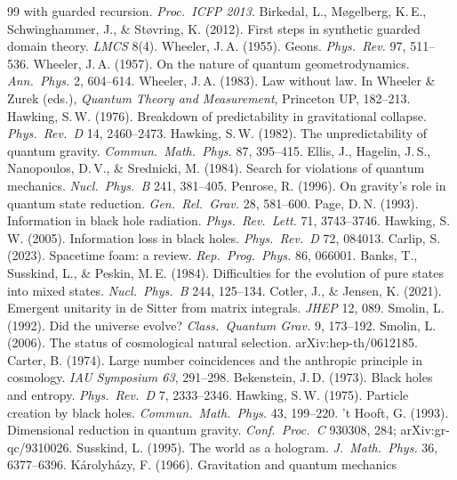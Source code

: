 \documentclass[11pt]{article}
\begin{document}
\begin{thebibliography}{99}
  with guarded recursion. \emph{Proc.\ ICFP 2013}.
 Birkedal, L., M\o gelberg, K.\,E., Schwinghammer, J., \&
  St\o vring, K. (2012). First steps in synthetic guarded domain theory.
  \emph{LMCS} 8(4).
 Wheeler, J.\,A. (1955). Geons. \emph{Phys.\ Rev.} 97, 511--536.
 Wheeler, J.\,A. (1957). On the nature of quantum
  geometrodynamics. \emph{Ann.\ Phys.} 2, 604--614.
 Wheeler, J.\,A. (1983). Law without law. In Wheeler \& Zurek
  (eds.), \emph{Quantum Theory and Measurement}, Princeton UP, 182--213.
 Hawking, S.\,W. (1976). Breakdown of predictability in
  gravitational collapse. \emph{Phys.\ Rev.\ D} 14, 2460--2473.
 Hawking, S.\,W. (1982). The unpredictability of quantum
  gravity. \emph{Commun.\ Math.\ Phys.} 87, 395--415.
 Ellis, J., Hagelin, J.\,S., Nanopoulos, D.\,V., \&
  Srednicki, M. (1984). Search for violations of quantum mechanics.
  \emph{Nucl.\ Phys.\ B} 241, 381--405.
 Penrose, R. (1996). On gravity's role in quantum state
  reduction. \emph{Gen.\ Rel.\ Grav.} 28, 581--600.
 Page, D.\,N. (1993). Information in black hole radiation.
  \emph{Phys.\ Rev.\ Lett.} 71, 3743--3746.
 Hawking, S.\,W. (2005). Information loss in black holes.
  \emph{Phys.\ Rev.\ D} 72, 084013.
 Carlip, S. (2023). Spacetime foam: a review. \emph{Rep.\
  Prog.\ Phys.} 86, 066001.
 Banks, T., Susskind, L., \& Peskin, M.\,E. (1984).
  Difficulties for the evolution of pure states into mixed states.
  \emph{Nucl.\ Phys.\ B} 244, 125--134.
 Cotler, J., \& Jensen, K. (2021). Emergent unitarity in de
  Sitter from matrix integrals. \emph{JHEP} 12, 089.
 Smolin, L. (1992). Did the universe evolve? \emph{Class.\
  Quantum Grav.} 9, 173--192.
\bibitem{Smo06} Smolin, L. (2006). The status of cosmological natural
  selection. arXiv:hep-th/0612185.
\bibitem{Car74} Carter, B. (1974). Large number coincidences and the
  anthropic principle in cosmology. \emph{IAU Symposium 63}, 291--298.
\bibitem{Bek73} Bekenstein, J.\,D. (1973). Black holes and entropy.
  \emph{Phys.\ Rev.\ D} 7, 2333--2346.
\bibitem{Haw75} Hawking, S.\,W. (1975). Particle creation by black holes.
  \emph{Commun.\ Math.\ Phys.} 43, 199--220.
\bibitem{tHooft93} 't Hooft, G. (1993). Dimensional reduction in quantum
  gravity. \emph{Conf.\ Proc.\ C} 930308, 284; arXiv:gr-qc/9310026.
\bibitem{Suss95} Susskind, L. (1995). The world as a hologram. \emph{J.\ Math.\
  Phys.} 36, 6377--6396.
\bibitem{Kar66} K\'arolyh\'azy, F. (1966). Gravitation and quantum mechanics

\end{thebibliography}
\end{document}
